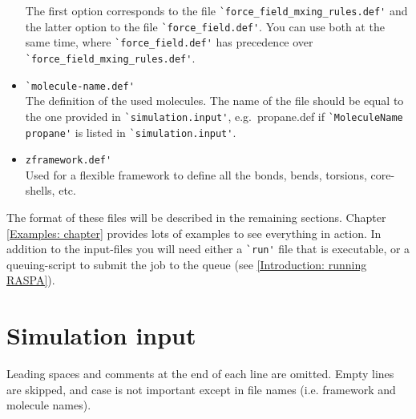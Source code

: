 \begin{itemize}
The first option corresponds to the file \verb=`force_field_mxing_rules.def'= and the latter option to the file \verb=`force_field.def'=. You can use both
at the same time, where \verb=`force_field.def'= has precedence over \verb=`force_field_mxing_rules.def'=.
\item{\verb=`molecule-name.def'=}\\
The definition of the used molecules.
The name of the file should be equal to the one provided in \verb=`simulation.input'=, e.g.\ propane.def if \verb=`MoleculeName propane'= is listed in
\verb=`simulation.input'=.
\item{\verb=zframework.def'=}\\
Used for a flexible framework to define all the bonds, bends, torsions, core-shells, etc.
\end{itemize}

The format of these files will be described in the remaining sections. Chapter \ref{Examples: chapter} provides lots of examples to see everything in action.
In addition to the input-files you will need either a \verb=`run'= file that is executable, or a queuing-script to submit the job to the queue
(see \ref{Introduction: running RASPA}).

\section{Simulation input}

Leading spaces and comments at the end of each line are omitted. Empty lines are skipped, 
and case is not important except in file names (i.e. framework and molecule names).

